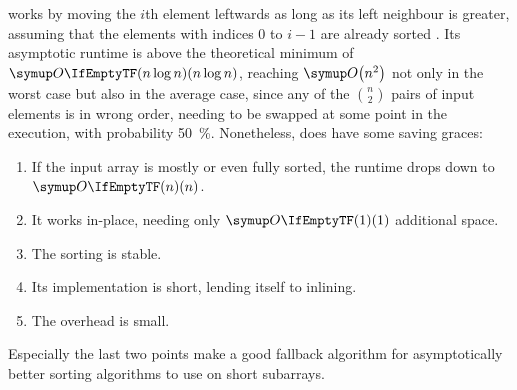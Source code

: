 \section{\texorpdfstring{\IS{}}{InsertionSort}}
\label{sec:tasklet:insertion}

\IS{} works by moving the \(i\)th element leftwards as long as its left neighbour is greater, assuming that the elements with indices \(0\) to \(i - 1\) are already sorted \cites[83]{maurer1974datenstrukturen}[Chapter~2.2.1]{wirth1975algorithmen}.
Its asymptotic runtime is above the theoretical minimum of \(\bigoh{n \log n}\), reaching \(\bigoh*{n^2}\) not only in the worst case but also in the average case, since any of the \(\binom{n}{2}\) pairs of input elements is in wrong order, needing to be swapped at some point in the execution, with probability \qty{50}{\percent}.
Nonetheless, \IS{} does have some saving graces:
\begin{enumerate}
	\item
	If the input array is mostly or even fully sorted, the runtime drops down to \(\bigoh{n}\).

	\item
	It works in-place, needing only \(\bigoh{1}\) additional space.

	\item
	The sorting is stable.

	\item
	Its implementation is short, lending itself to inlining.

	\item
	The overhead is small.
\end{enumerate}
Especially the last two points make \IS{} a good fallback algorithm for asymptotically better sorting algorithms to use on short subarrays.






